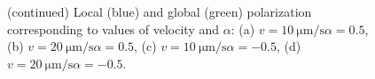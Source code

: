 \documentclass[../../master_thesis_np.tex]{subfiles}
\begin{document}
		\begin{figure}
			\centering
			\ContinuedFloat
			\caption{(continued) Local (blue) and global (green) polarization corresponding to values of velocity and $\alpha$: (a) $v = \SI{10}{\um \per \second} \alpha = 0.5$, (b) $v = \SI{20}{\um \per \second} \alpha = 0.5$, (c) $v = \SI{10}{\um \per \second} \alpha = -0.5$, (d) $v = \SI{20}{\um \per \second} \alpha = -0.5$.}
			\label{fig:lj_velocity_pol}
		\end{figure}
		
\end{document}
